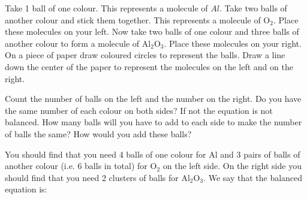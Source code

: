 Take 1 ball of one colour. This represents a molecule of \begin{math}Al\end{math}. Take two balls of another colour and stick them together. This represents a molecule of \begin{math}{\mathrm{O}}_{2}\end{math}. Place these molecules on your left. Now take two balls of one colour and three balls of another colour to form a molecule of \begin{math}{\mathrm{Al}}_{2}{\mathrm{O}}_{3}\end{math}. Place these molecules on your right. On a piece of paper draw coloured circles to represent the balls. Draw a line down the center of the paper to represent the molecules on the left and on the right. 
\par 
\label{m38726*id23534}
Count the number of balls on the left and the number on the right. Do you have the same number of each colour on both sides? If not the equation is not balanced. How many balls will you have to add to each side to make the number of balls the same? How would you add these balls?
\par 
\label{m38726*id09873432}You should find that you need 4 balls of one colour for \begin{math}\mathrm{Al}\end{math} and 3 pairs of balls of another colour (i.e. 6 balls in total) for \begin{math}{\mathrm{O}}_{2}\end{math} on the left side. On the right side you should find that you need 2 clusters of balls for \begin{math}{\mathrm{Al}}_{2}{\mathrm{O}}_{3}\end{math}.
We say that the balanced equation is:
\label{m38726*id97235}\nopagebreak\noindent{}
